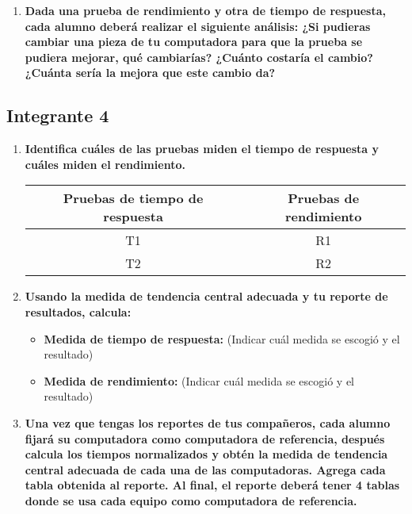 \documentclass[12pt]{article}
\newcommand{\pl}[1]{\item \textbf{ #1 }}
\begin{document}
\begin{enumerate}[(3.3.1)]
    \pl{Dada una prueba de rendimiento y otra de tiempo de respuesta, cada alumno deberá realizar el siguiente análisis: ¿Si pudieras cambiar una pieza de tu computadora para que la prueba se pudiera mejorar, qué cambiarías? ¿Cuánto costaría el cambio? ¿Cuánta sería la mejora que este cambio da?}

\end{enumerate}

\subsection{Integrante 4}

\begin{enumerate}[(3.4.1)]
    \pl{Identifica cuáles de las pruebas miden el tiempo de respuesta y cuáles miden el rendimiento.}
    \begin{table}[htb]
        \centering
        \begin{tabular}{|c|c|}
        \hline
        Pruebas de tiempo de respuesta & Pruebas de rendimiento \\
        \hline
        T1 & R1 \\
        \hline
        T2 & R2 \\
        \hline
        \end{tabular}
    \end{table}\par

    \pl{Usando la medida de tendencia central adecuada y tu reporte de resultados, calcula:}
    \begin{itemize}
        \pl{Medida de tiempo de respuesta:}(Indicar cuál medida se escogió y el resultado)\par
    
        \pl{Medida de rendimiento:} (Indicar cuál medida se escogió y el resultado)\par
    \end{itemize}

    \pl{Una vez que tengas los reportes de tus compañeros, cada alumno fijará su computadora como computadora de referencia, después calcula los tiempos normalizados y obtén la medida de tendencia central adecuada de cada una de las computadoras. Agrega cada tabla obtenida al reporte. Al final, el reporte deberá tener 4 tablas donde se usa cada equipo como computadora de referencia.}


\end{enumerate}
\end{document}
